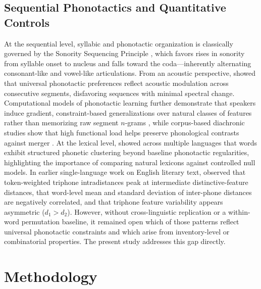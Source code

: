 \documentclass[11pt,a4paper,leqno]{article}
\begin{document}
\subsection{Sequential Phonotactics and Quantitative Controls}
At the sequential level, syllabic and phonotactic organization is classically governed by the Sonority Sequencing Principle \citep{clements1990}, which favors rises in sonority from syllable onset to nucleus and falls toward the coda---inherently alternating consonant-like and vowel-like articulations. From an acoustic perspective, \citet{kawasakifukumori1992} showed that universal phonotactic preferences reflect acoustic modulation across consecutive segments, disfavoring sequences with minimal spectral change. Computational models of phonotactic learning further demonstrate that speakers induce gradient, constraint-based generalizations over natural classes of features rather than memorizing raw segment $n$-grams \citep{hayes2008}, while corpus-based diachronic studies show that high functional load helps preserve phonological contrasts against merger \citep{wedel2013}. At the lexical level, \citet{dautriche2017} showed across multiple languages that words exhibit structured phonetic clustering beyond baseline phonotactic regularities, highlighting the importance of comparing natural lexicons against controlled null models. In earlier single-language work on English literary text, \citet{araujo2013thesis} observed that token-weighted triphone intradistances peak at intermediate distinctive-feature distances, that word-level mean and standard deviation of inter-phone distances are negatively correlated, and that triphone feature variability appears asymmetric ($d_1 > d_2$). However, without cross-linguistic replication or a within-word permutation baseline, it remained open which of those patterns reflect universal phonotactic constraints and which arise from inventory-level or combinatorial properties. The present study addresses this gap directly.

\section{Methodology}
\end{document}
